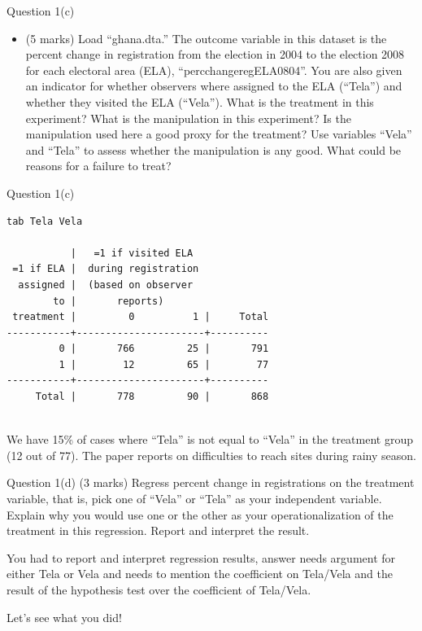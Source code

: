 \documentclass[xcolor=table,dvipsnames]{beamer}
\begin{document}
\begin{frame}{Question 1(c)}

\begin{itemize}
\item[] (5 marks) Load ``ghana.dta.''
The outcome variable in this dataset is the percent change in registration from the election in 2004 to the election 2008 for each electoral area (ELA), ``percchangeregELA0804''. 
You are also given an indicator for whether observers where assigned to the ELA (``Tela'') and whether they visited the ELA (``Vela'').
What is the treatment in this experiment? 
What is the manipulation in this experiment? 
Is the manipulation used here a good proxy for the treatment? 
Use variables ``Vela'' and ``Tela'' to assess whether the manipulation is any good. 
What could be reasons for a failure to treat?
\end{itemize}
\end{frame}

\begin{frame}[fragile]{Question 1(c)}
\begin{lstlisting}
tab Tela Vela

           |   =1 if visited ELA
 =1 if ELA |  during registration
  assigned |  (based on observer
        to |       reports)
 treatment |         0          1 |     Total
-----------+----------------------+----------
         0 |       766         25 |       791 
         1 |        12         65 |        77 
-----------+----------------------+----------
     Total |       778         90 |       868 
	
\end{lstlisting}
We have 15\% of cases where ``Tela'' is not equal to ``Vela'' in the treatment group (12 out of 77). 
The paper reports on difficulties to reach sites during rainy season.
\end{frame}

\begin{frame}{Question 1(d)}
(3 marks) Regress percent change in registrations on the treatment variable, that is, pick one of ``Vela'' or ``Tela'' as your independent variable. 
Explain why you would use one or the other as your operationalization of the treatment in this regression. 
Report and interpret the result. \pause

You had to report and interpret regression results, answer needs argument for either Tela or Vela and needs to mention the coefficient on Tela/Vela and the result of the hypothesis test over the coefficient of Tela/Vela. \pause

Let's see what you did!
\end{frame}
\end{document}
